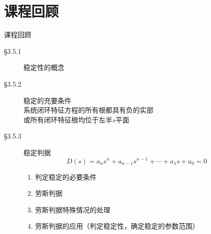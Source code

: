 \documentclass[handout,cjkutf8,table,aspectratio=1610]{beamer} %
\begin{document}
\section*{课程回顾}
\begin{frame}{课程回顾}
\begin{description}
\item[\S3.5.1]\alert{稳定性的概念} 
\item[\S3.5.2]\alert{稳定的充要条件} \\ 系统闭环特征方程的所有根都具有负的实部\\
或所有闭环特征根均位于左半$s$平面 
\item[\S3.5.3]\alert{稳定判据}
$$D(s)=a_ns^n+a_{n-1}s^{n-1}+\cdots+a_1s+a_0=0$$
\vspace{-1em}
\begin{enumerate}
\item 判定稳定的必要条件
\item 劳斯判据
\item 劳斯判据特殊情况的处理
\item 劳斯判据的应用（判定稳定性，确定稳定的参数范围） 
\end{enumerate}
\end{description}
\end{frame}
\end{document}
